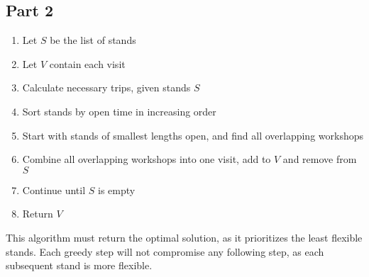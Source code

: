 \documentclass{article}
\begin{document}
\subsection{Part 2}

\begin{enumerate}
    \item Let $S$ be the list of stands
    \item Let $V$ contain each visit
    \item Calculate necessary trips, given stands $S$
    \item Sort stands by open time in increasing order
    \item Start with stands of smallest lengths open, and find all overlapping workshops
    \item Combine all overlapping workshops into one visit, add to $V$ and remove from $S$
    \item Continue until $S$ is empty
    \item Return $V$
\end{enumerate}

This algorithm must return the optimal solution, as it prioritizes the least flexible stands.
Each greedy step will not compromise any following step, as each subsequent stand is more flexible.
\end{document}
